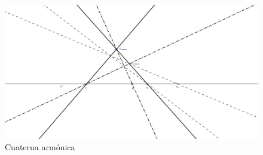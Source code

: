 \begin{figure}[h]
	\centering
	\includegraphics[scale=.4]{Graficos/RazonDoble/razon_doble-eps-converted-to}
	\caption{Cuaterna armónica}
	\label{C5_img_cuaterna_armonica}
\end{figure}

